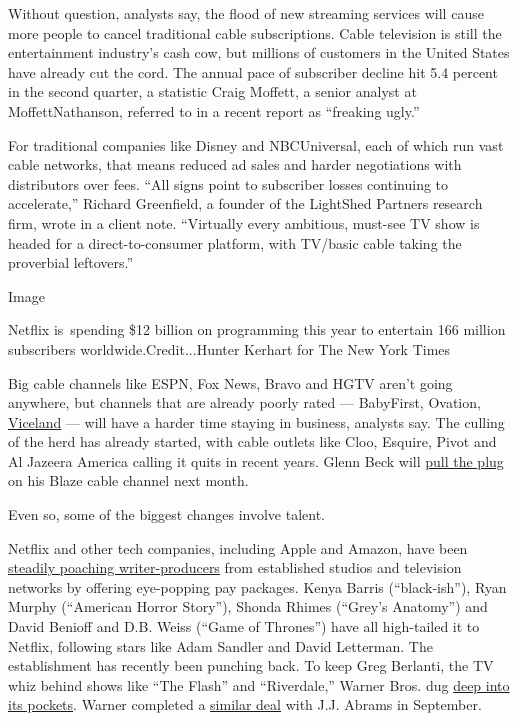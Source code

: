 Without question, analysts say, the flood of new streaming services will
cause more people to cancel traditional cable subscriptions. Cable
television is still the entertainment industry's cash cow, but millions
of customers in the United States have already cut the cord. The annual
pace of subscriber decline hit 5.4 percent in the second quarter, a
statistic Craig Moffett, a senior analyst at MoffettNathanson, referred
to in a recent report as ``freaking ugly.''

For traditional companies like Disney and NBCUniversal, each of which
run vast cable networks, that means reduced ad sales and harder
negotiations with distributors over fees. ``All signs point to
subscriber losses continuing to accelerate,'' Richard Greenfield, a
founder of the LightShed Partners research firm, wrote in a client note.
``Virtually every ambitious, must-see TV show is headed for a
direct-to-consumer platform, with TV/basic cable taking the proverbial
leftovers.''

Image

Netflix is~spending \$12 billion on programming this year to entertain
166 million subscribers worldwide.Credit...Hunter Kerhart for The New
York Times

Big cable channels like ESPN, Fox News, Bravo and HGTV aren't going
anywhere, but channels that are already poorly rated --- BabyFirst,
Ovation,
\href{https://www.nytimes3xbfgragh.onion/2016/02/29/arts/television/viceland-a-new-cable-channel-aims-to-stand-out.html?searchResultPosition=1}{Viceland}
--- will have a harder time staying in business, analysts say. The
culling of the herd has already started, with cable outlets like Cloo,
Esquire, Pivot and Al Jazeera America calling it quits in recent years.
Glenn Beck will
\href{https://www.hollywoodreporter.com/news/glenn-becks-blaze-end-linear-tv-1252902}{pull
the plug} on his Blaze cable channel next month.

Even so, some of the biggest changes involve talent.

Netflix and other tech companies, including Apple and Amazon, have been
\href{https://www.latimes.com/projects/la-et-netflix-job-report/}{steadily
poaching writer-producers} from established studios and television
networks by offering eye-popping pay packages. Kenya Barris
(``black-ish''), Ryan Murphy (``American Horror Story''), Shonda Rhimes
(``Grey's Anatomy'') and David Benioff and D.B. Weiss (``Game of
Thrones'') have all high-tailed it to Netflix, following stars like Adam
Sandler and David Letterman. The establishment has recently been
punching back. To keep Greg Berlanti, the TV whiz behind shows like
``The Flash'' and ``Riverdale,'' Warner Bros. dug
\href{https://www.nytimes3xbfgragh.onion/2018/06/07/business/media/greg-berlanti-warner-bros.html}{deep
into its pockets}. Warner completed a
\href{https://www.nytimes3xbfgragh.onion/2019/06/17/business/media/jj-abrams-warnermedia.html}{similar
deal} with J.J. Abrams in September.

